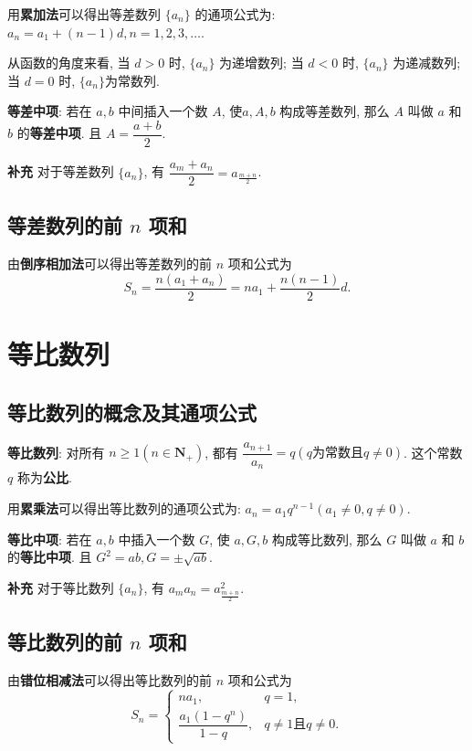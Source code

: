 \documentclass[titlepage]{ctexart}
\begin{document}
用\textbf{累加法}可以得出等差数列 $\{a_{n}\}$ 的通项公式为: $a_{n} = a_{1} + (n-1)d, n = 1,2,3,\dots$.

从函数的角度来看, 当 $d > 0$ 时, $\{a_{n}\}$ 为递增数列; 当 $d < 0$ 时, $\{a_{n}\}$ 为递减数列; 当 $d = 0$ 时, $\{a_{n}\}$为常数列.

\textbf{等差中项}: 若在 $a, b$ 中间插入一个数 $A$, 使$a, A, b$ 构成等差数列, 那么 $A$ 叫做 $a$ 和 $b$ 的\textbf{等差中项}. 且 $A = \dfrac{a+b}{2}$.

\textbf{补充} \quad 对于等差数列 $\{a_n\}$, 有 $\dfrac{a_m + a_n}{2} = a_{\frac{m+n}{2}}$.

\subsection{等差数列的前 $n$ 项和}

由\textbf{倒序相加法}可以得出等差数列的前 $n$ 项和公式为
\[
S_n = \frac{n(a_1 + a_n)}{2} = na_1 + \frac{n(n-1)}{2}d.
\]


\section{等比数列}

\subsection{等比数列的概念及其通项公式}

\textbf{等比数列}: 对所有 $n \geqslant 1(n \in \mathbf{N_+})$, 都有 $\dfrac{a_{n+1}}{a_n} = q(q\text{为常数且} q \neq 0)$. 这个常数 $q$ 称为\textbf{公比}.

用\textbf{累乘法}可以得出等比数列的通项公式为: $a_n = a_1 q^{n-1} (a_1 \neq 0, q \neq 0)$.

\textbf{等比中项}: 若在 $a, b$ 中插入一个数 $G$, 使 $a, G, b$ 构成等比数列, 那么 $G$ 叫做 $a$ 和 $b$ 的\textbf{等比中项}. 且 $G^2 = ab, G = \pm \sqrt{ab}$. 

\textbf{补充} \quad 对于等比数列 $\{a_n\}$, 有 $a_ma_n = a_{\frac{m+n}{2}}^2$.

\subsection{等比数列的前 $n$ 项和}

由\textbf{错位相减法}可以得出等比数列的前 $n$ 项和公式为
\[
S_n = 
\begin{cases}
    na_1, &q= 1, \\
    \dfrac{a_1(1-q^n)}{1-q}, &q\neq 1 \text{且}q \neq 0.
\end{cases}
\]
\end{document}
